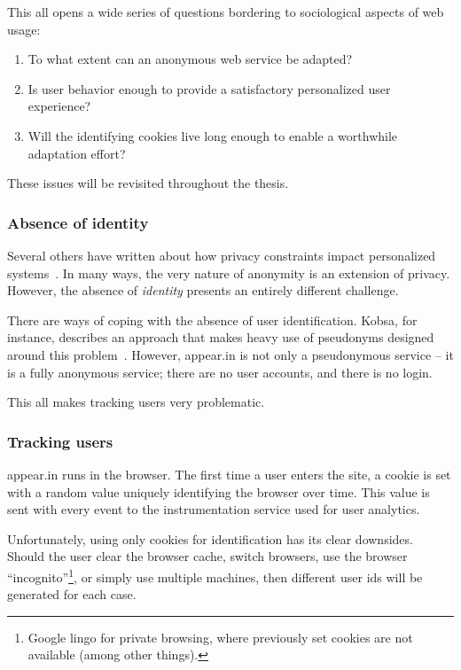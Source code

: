 This all opens a wide series of questions bordering to sociological aspects of web usage:

\begin{enumerate}
  \item To what extent can an anonymous web service be adapted?
  \item Is user behavior enough to provide a satisfactory personalized user experience?
  \item Will the identifying cookies live long enough to enable a worthwhile adaptation effort?
\end{enumerate}

These issues will be revisited throughout the thesis.

\subsubsection{Absence of identity} %

Several others have written about how privacy constraints impact personalized systems~\cite{Teltzrow2004,Kobsa2007}. In many ways, the very nature of anonymity is an extension of privacy. However, the absence of \emph{identity} presents an entirely different challenge.

There are ways of coping with the absence of user identification. Kobsa, for instance, describes an approach that makes heavy use of pseudonyms designed around this problem~\cite{Kobsa2003}.
However, appear.in is not only a pseudonymous service -- it is a fully anonymous service; there are no user accounts, and there is no login.

This all makes tracking users very problematic.

\subsubsection{Tracking users}
\label{intro:sub:tracking_users}

appear.in runs in the browser. The first time a user enters the site, a cookie is set with a random value uniquely identifying the browser over time. This value is sent with every event to the instrumentation service used for user analytics.

Unfortunately, using only cookies for identification has its clear downsides. Should the user clear the browser cache, switch browsers, use the browser ``incognito''\footnote{Google lingo for private browsing, where previously set cookies are not available (among other things).}, or simply use multiple machines, then different user ids will be generated for each case.

